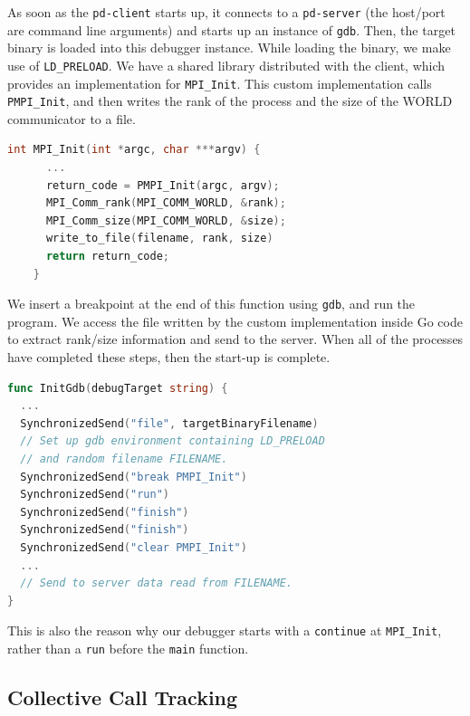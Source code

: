 \documentclass[10pt,conference]{IEEEtran}
\begin{document}
As soon as the \texttt{pd-client} starts up, it connects to a \texttt{pd-server} (the host/port are command line arguments) and starts up an instance of \texttt{gdb}. Then, the target binary is loaded into this debugger instance. While loading the binary, we make use of \texttt{LD\_PRELOAD}. We have a shared library distributed with the client, which provides an implementation for \texttt{MPI\_Init}. This custom implementation calls \texttt{PMPI\_Init}, and then writes the rank of the process and the size of the WORLD communicator to a file.

\begin{samepage}
  \begin{lstlisting}[language=C, caption=Start-up instrumentation]
    int MPI_Init(int *argc, char ***argv) {
      ...
      return_code = PMPI_Init(argc, argv);
      MPI_Comm_rank(MPI_COMM_WORLD, &rank);
      MPI_Comm_size(MPI_COMM_WORLD, &size);
      write_to_file(filename, rank, size)
      return return_code;
    }
  \end{lstlisting}
\end{samepage}

We insert a breakpoint at the end of this function using \texttt{gdb}, and run the program. We access the file written by the custom implementation inside Go code to extract rank/size information and send to the server. When all of the processes have completed these steps, then the start-up is complete.

\begin{samepage}
  \begin{lstlisting}[language=Go, caption=gdb.go: InitGdb]
func InitGdb(debugTarget string) {
  ...
  SynchronizedSend("file", targetBinaryFilename)
  // Set up gdb environment containing LD_PRELOAD
  // and random filename FILENAME.
  SynchronizedSend("break PMPI_Init")
  SynchronizedSend("run")
  SynchronizedSend("finish")
  SynchronizedSend("finish")
  SynchronizedSend("clear PMPI_Init")
  ...
  // Send to server data read from FILENAME.
}
\end{lstlisting}
\end{samepage}

This is also the reason why our debugger starts with a \texttt{continue} at \texttt{MPI\_Init}, rather than a \texttt{run} before the \texttt{main} function.

\subsection{Collective Call Tracking}
\end{document}
